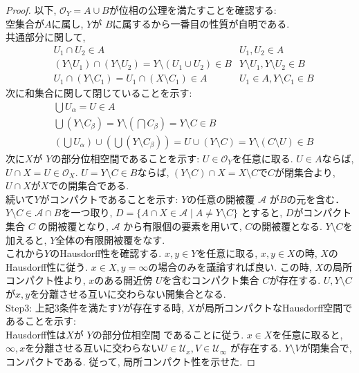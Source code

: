 \documentclass[lualatex]{ltjsbook}
\theoremstyle{remark}
\theoremstyle{plain}
\begin{document}
\begin{proof}
	 以下,  $\mathcal{O}_Y = A \cup B$が位相の公理を満たすことを確認する:\\
	 空集合が$A$に属し,   $Y$が $B$に属するから一番目の性質が自明である.\\
	 共通部分に関して, 
	 \begin{align*}
		& U_1 \cap U_2 \in A & U_1 ,  U_2 \in A \\
		& \left( Y \setminus U_1 \right) \cap \left( Y \setminus U_2 \right) = Y \setminus \left(U_1 \cup U_2  \right) \in B &Y\setminus U_1, Y\setminus U_2 \in B \\
		&U_1 \cap  \left( Y \setminus C_1 \right) = U_1  \cap \left( X \setminus C_1 \right) \in A & U_1 \in A ,  Y\setminus C_1 \in B 
	 \end{align*}
	 次に和集合に関して閉じていることを示す:
	 \begin{align*}
		& \bigcup U _{\alpha} = U \in A \\
		& \bigcup \left( Y \setminus C _{\beta} \right)  = Y \setminus \left( \bigcap C_{\beta}  \right) = Y \setminus C \in B  \\
		& \left( \bigcup U_{\alpha}  \right) \cup \left( \bigcup \left( Y \setminus C_{\beta} \right)   \right)  = U \cup (Y \setminus C) = Y \setminus \left( C \setminus U \right) \in B  
	 \end{align*}
	次に$X$が $Y$の部分位相空間であることを示す:  $U \in \mathcal{O}_Y$を任意に取る.
	$U \in  A$ならば,  $U \cap X = U \in \mathcal{O}_X $. $U = Y \setminus C \in B$ならば,  $\left( Y\setminus C \right) \cap X = X \setminus C $で$C$が閉集合より,   $U \cap X$が$X$での開集合である. \\
	続いて$Y$がコンパクトであることを示す:
	$Y$の任意の開被覆 $\mathcal{A}$ が$B$の元を含む． 
	$Y \setminus C \in \mathcal{A} \cap B$を一つ取り,   
	$D =\{ A \cap X \in \mathcal{A}  \mid A \neq Y \setminus C\} $ とすると,  
	$D$がコンパクト集合 $C$ の開被覆となり,  
	$\mathcal{A}$ から有限個の要素を用いて,  $C$の開被覆となる.  
	$Y \setminus C$を加えると,  $Y$全体の有限開被覆をなす.\\
	これから$Y$のHausdorff性を確認する.  $x,  y \in Y$を任意に取る,  $x,  y \in X$の時,  $X$のHausdorff性に従う.  $x \in X ,  y = \infty$の場合のみを議論すれば良い. この時,  $X$の局所コンパクト性より,   $x$のある開近傍 $U$を含むコンパクト集合 $C$が存在する.  $U ,  Y \setminus C$が$x, y$を分離させる互いに交わらない開集合となる.\\
	Step3: 上記3条件を満たす$Y$が存在する時,   $X$が局所コンパクトなHausdorff空間であることを示す:\\
	Hausdorff性は$X$が $Y$の部分位相空間 であることに従う. $x \in X$を任意に取ると,  $\infty , x$を分離させる互いに交わらない$U \in \mathcal{U}_x,  V \in \mathcal{U}_{\infty}$ が存在する. $Y \setminus V$が閉集合で,  コンパクトである. 従って,  局所コンパクト性を示せた.
	

\end{proof}
\end{document}
